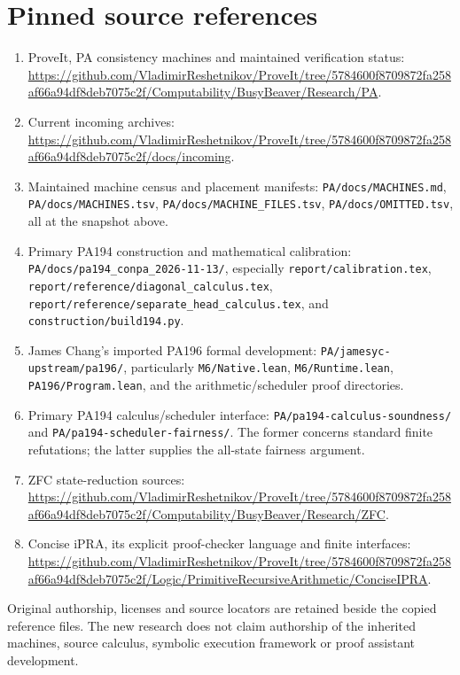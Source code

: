 \documentclass[11pt,letterpaper]{article}
\newcommand{\file}[1]{\texttt{\nolinkurl{#1}}}
\begin{document}
\section{Pinned source references}\label{sec:references}
\begin{enumerate}
\item ProveIt, PA consistency machines and maintained verification status:
\url{https://github.com/VladimirReshetnikov/ProveIt/tree/5784600f8709872fa258af66a94df8deb7075c2f/Computability/BusyBeaver/Research/PA}.
\item Current incoming archives:
\url{https://github.com/VladimirReshetnikov/ProveIt/tree/5784600f8709872fa258af66a94df8deb7075c2f/docs/incoming}.
\item Maintained machine census and placement manifests:
\file{PA/docs/MACHINES.md}, \file{PA/docs/MACHINES.tsv},
\file{PA/docs/MACHINE_FILES.tsv}, \file{PA/docs/OMITTED.tsv}, all at the snapshot above.
\item Primary PA194 construction and mathematical calibration:
\file{PA/docs/pa194_conpa_2026-11-13/}, especially
\file{report/calibration.tex}, \file{report/reference/diagonal_calculus.tex},
\file{report/reference/separate_head_calculus.tex}, and
\file{construction/build194.py}.
\item James Chang's imported PA196 formal development:
\file{PA/jamesyc-upstream/pa196/}, particularly
\file{M6/Native.lean}, \file{M6/Runtime.lean},
\file{PA196/Program.lean}, and the arithmetic/scheduler proof directories.
\item Primary PA194 calculus/scheduler interface:
\file{PA/pa194-calculus-soundness/} and
\file{PA/pa194-scheduler-fairness/}. The former concerns standard finite
refutations; the latter supplies the all-state fairness argument.
\item ZFC state-reduction sources:
\url{https://github.com/VladimirReshetnikov/ProveIt/tree/5784600f8709872fa258af66a94df8deb7075c2f/Computability/BusyBeaver/Research/ZFC}.
\item Concise iPRA, its explicit proof-checker language and finite interfaces:
\url{https://github.com/VladimirReshetnikov/ProveIt/tree/5784600f8709872fa258af66a94df8deb7075c2f/Logic/PrimitiveRecursiveArithmetic/ConciseIPRA}.
\end{enumerate}
Original authorship, licenses and source locators are retained beside the
copied reference files. The new research does not claim authorship of the
inherited machines, source calculus, symbolic execution framework or proof
assistant development.
\end{document}
